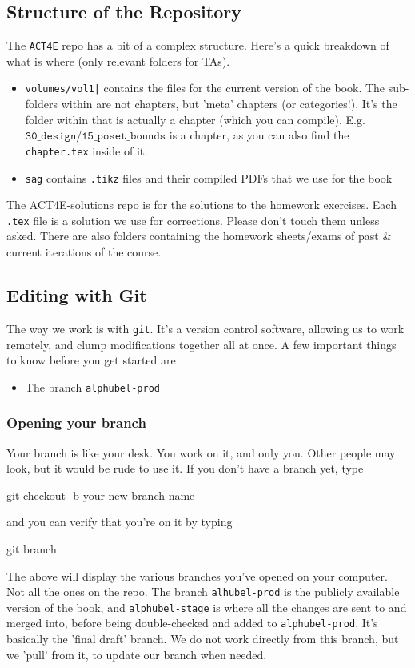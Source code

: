 \documentclass{article}
\begin{document}
\subsection{Structure of the Repository}
The \texttt{ACT4E} repo has a bit of a complex structure. Here's a quick breakdown of what is where (only relevant folders for TAs).
\begin{itemize}
    \item \texttt{volumes/vol1|} contains the files for the current version of the book. The sub-folders within are not chapters, but 'meta' chapters (or categories!). It's the folder within that is actually a chapter (which you can compile). E.g. $\texttt{30\_design/15\_poset\_bounds}$ is a chapter, as you can also find the \texttt{chapter.tex} inside of it.
    \item \texttt{sag} contains \texttt{.tikz} files and their compiled PDFs that we use for the book
\end{itemize}
The ACT4E-solutions repo is for the solutions to the homework exercises. Each \texttt{.tex} file is a solution we use for corrections. Please don't touch them unless asked. There are also folders containing the homework sheets/exams of past \& current iterations of the course.
\subsection{Editing with Git}


The way we work is with \texttt{git}. It's a version control software, allowing us to work remotely, and clump modifications together all at once. A few important things to know before you get started are
\begin{itemize}
\item The branch \texttt{alphubel-prod}
\end{itemize}
\subsubsection{Opening your branch}
Your branch is like your desk. You work on it, and only you. Other people may look, but it would be rude to use it. If you don't have a branch yet, type
\begin{bashcode}
     git checkout -b your-new-branch-name
\end{bashcode}
and you can verify that you're on it by typing
\begin{bashcode}
    git branch
\end{bashcode}
The above will display the various branches you've opened on your computer. Not all the ones on the repo. The branch \texttt{alhubel-prod} is the publicly available version of the book, and \texttt{alphubel-stage} is where all the changes are sent to and merged into, before being double-checked and added to \texttt{alphubel-prod}. It's basically the 'final draft' branch. We do not work directly from this branch, but we 'pull' from it, to update our branch when needed.
\end{document}
